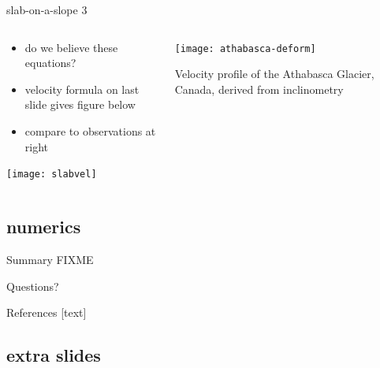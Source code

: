 \documentclass[10pt,dvipsnames]{beamer}
\begin{document}
\begin{frame}{slab-on-a-slope 3}

\begin{columns}
\begin{column}{0.6\textwidth}
\begin{itemize}
\item do we believe these equations?
\item velocity formula on last slide gives figure below
\item compare to observations at right
\end{itemize}
\begin{center}
\texttt{[image: slabvel]}
\end{center}
\end{column}

\begin{column}{0.4\textwidth}
\texttt{[image: athabasca-deform]}

\medskip
\scriptsize
Velocity profile of the Athabasca Glacier, Canada, derived from inclinometry \cite{SavagePaterson1963}
\end{column}
\end{columns}
\end{frame}


\subsection{numerics}

\begin{frame}{Summary}
FIXME
\end{frame}

\begin{frame}[standout]
  Questions?
\end{frame}

\appendix


\begin{frame}[allowframebreaks]{References}
[text]

  
  
\end{frame}


\subsection[]{extra slides}
\end{document}
